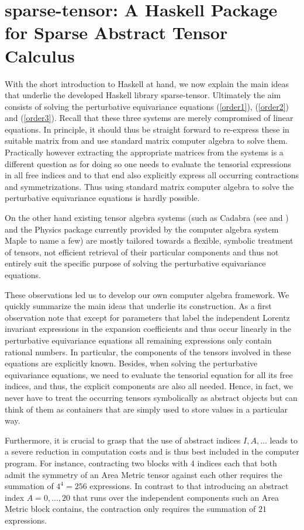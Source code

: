 \documentclass[a4paper,12pt, DIV=14, BCOR=5mm, twoside, headsepline, numbers=noenddot]{scrbook}
\begin{document}
\section{sparse-tensor: A Haskell Package for Sparse Abstract Tensor Calculus}
With the short introduction to Haskell at hand, we now explain the main ideas that underlie the developed Haskell library sparse-tensor. Ultimately the aim consists of solving the perturbative equivariance equations (\ref{order1}), (\ref{order2}) and (\ref{order3}). Recall that these three systems are merely compromised of linear equations. In principle, it should thus be straight forward to re-express these in suitable matrix from and use standard matrix computer algebra to solve them. Practically however extracting the appropriate matrices from the systems is a different question as for doing so one needs to evaluate the tensorial expressions in all free indices and to that end also
explicitly express all occurring contractions and symmetrizations.
Thus using standard matrix computer algebra to solve the perturbative equivariance equations is hardly possible.

On the other hand existing tensor algebra systems (such as Cadabra (see \cite{cadabra1} and \cite{cadabra2}) and the Physics package currently provided by the computer algebra system Maple to name a few) are mostly tailored towards a flexible, symbolic treatment of tensors, not efficient retrieval of their particular components and thus not entirely suit the specific purpose of solving the perturbative equivariance equations. 

These observations led us to develop our own computer algebra framework. We quickly summarize the main ideas that underlie its construction.
As a first observation note that except for parameters that label the independent Lorentz invariant expressions in the expansion coefficients and thus occur linearly in the perturbative equivariance equations all remaining expressions only contain rational numbers. In particular, the components of the tensors involved in these equations are explicitly known. Besides, when solving the perturbative equivariance equations, we need to evaluate the tensorial equation for all its free indices, and thus, the explicit components are also all needed. Hence, in fact, we never have to treat the occurring tensors symbolically as abstract objects but can think of them as containers that are simply used to store values in a particular way. 

Furthermore, it is crucial to grasp that the use of abstract indices $I, A, ...$ leads to a severe reduction in computation costs and is thus best included in the computer program. For instance, contracting two blocks with $4$ indices each that both admit the symmetry of an Area Metric tensor against each other requires the summation of $4^4 = 256$ expressions. In contrast to that introducing an abstract index $A = 0,...,20$ that runs over the independent components such an Area Metric block contains, the contraction only requires the summation of $21$ expressions.
\end{document}
